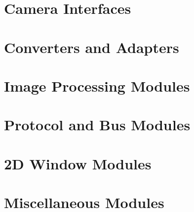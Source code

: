


\clearpage
\section{Camera Interfaces}




\clearpage
\section{Converters and Adapters}




\clearpage
\section{Image Processing Modules}




\clearpage
\section{Protocol and Bus Modules}




\clearpage
\section{2D Window Modules}




\clearpage
\section{Miscellaneous Modules}






\clearpage



